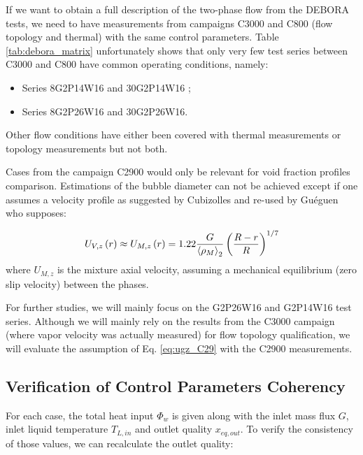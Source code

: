 If we want to obtain a full description of the two-phase flow from the DEBORA tests, we need to have measurements from campaigns C3000 and C800 (flow topology and thermal) with the same control parameters. Table \ref{tab:debora_matrix} unfortunately shows that only very few test series between C3000 and C800 have common operating conditions, namely:

\begin{itemize}
\item Series 8G2P14W16 and 30G2P14W16 ;
\item Series 8G2P26W16 and 30G2P26W16.
\end{itemize}

Other flow conditions have either been covered with thermal measurements or topology measurements but not both. 

\begin{remark*}{}
Cases from the campaign C2900 would only be relevant for void fraction profiles comparison. Estimations of the bubble diameter can not be achieved except if one assumes a velocity profile as suggested by Cubizolles \cite{cubizolles_etude_1996} and re-used by Guéguen \cite{gueguen_contribution_2013} who supposes:

\begin{equation}
U_{V,z}\left( r \right) \approx U_{M,z}\left( r \right) = 1.22 \frac{G}{\left< \rho_{M} \right>_{2}} \left(  \frac{R-r}{R} \right)^{1/7}
\label{eq:ugz_C29}
\end{equation}
where $U_{M,z}$ is the mixture axial velocity, assuming a mechanical equilibrium (\ie zero slip velocity) between the phases.

\end{remark*}


For further studies, we will mainly focus on the G2P26W16 and G2P14W16 test series. Although we will mainly rely on the results from the C3000 campaign (where vapor velocity was actually measured) for flow topology qualification, we will evaluate the assumption of Eq. \ref{eq:ugz_C29} with the C2900 measurements.


\subsection{Verification of Control Parameters Coherency}

For each case, the total heat input $\Phi_{w}$ is given along with the inlet mass flux $G$, inlet liquid temperature $T_{L,in}$ and outlet quality $x_{eq,out}$. To verify the consistency of those values, we can recalculate the outlet quality:

